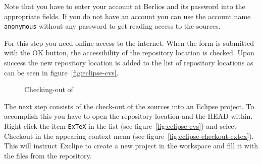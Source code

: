 \documentclass{extex-doc}
\newcommand\menu{\textsf}
\begin{document}
Note that you have to enter your account at Berlios and its password
into the appropriate fields. If you do not have an account you can use
the account name \texttt{anonymous} without any password to get
reading access to the sources.

For this step you need online access to the internet. When the form is
submitted with the OK button, the accessibility of the repository
location is checked. Upon success the new repository location is
added to the list of repository locations as can be seen in
figure~\ref{fig:eclipse-cvs}.
\begin{figure}[htp]
  \hbox{}\hfill
  \hfill
  \caption{Checking-out of \ExTeX}
\end{figure}

The next step consists of the check-out of the sources into an Eclipse
project. To accomplish this you have to open the repository location
and the HEAD within. Right-click the item \texttt{ExTeX} in the list
(see figure~\ref{fig:eclipse-cvs}) and select \menu{Checkout} in the
appearing context menu (see figure~\ref{fig:eclipse-checkout-extex}).
This will instruct Exclipe to create a new project in the workspace
and fill it with the files from the repository.
\end{document}
